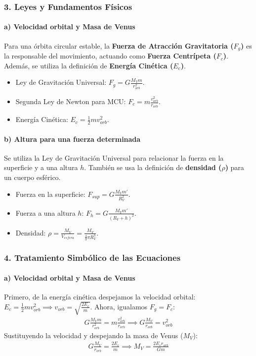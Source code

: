 \subsubsection*{3. Leyes y Fundamentos Físicos}
\paragraph*{a) Velocidad orbital y Masa de Venus}
Para una órbita circular estable, la \textbf{Fuerza de Atracción Gravitatoria ($F_g$)} es la responsable del movimiento, actuando como \textbf{Fuerza Centrípeta ($F_c$)}. Además, se utiliza la definición de \textbf{Energía Cinética ($E_c$)}.
\begin{itemize}
    \item Ley de Gravitación Universal: $F_g = G \frac{M_V m}{r_{orb}^2}$.
    \item Segunda Ley de Newton para MCU: $F_c = m \frac{v_{orb}^2}{r_{orb}}$.
    \item Energía Cinética: $E_c = \frac{1}{2} m v_{orb}^2$.
\end{itemize}
\paragraph*{b) Altura para una fuerza determinada}
Se utiliza la Ley de Gravitación Universal para relacionar la fuerza en la superficie y a una altura $h$. También se usa la definición de \textbf{densidad ($\rho$)} para un cuerpo esférico.
\begin{itemize}
    \item Fuerza en la superficie: $F_{sup} = G \frac{M_V m'}{R_V^2}$.
    \item Fuerza a una altura $h$: $F_h = G \frac{M_V m'}{(R_V+h)^2}$.
    \item Densidad: $\rho = \frac{M_V}{V_{esfera}} = \frac{M_V}{\frac{4}{3}\pi R_V^3}$.
\end{itemize}

\subsubsection*{4. Tratamiento Simbólico de las Ecuaciones}
\paragraph*{a) Velocidad orbital y Masa de Venus}
Primero, de la energía cinética despejamos la velocidad orbital:
$E_c = \frac{1}{2} m v_{orb}^2 \implies v_{orb} = \sqrt{\frac{2 E_c}{m}}$.
Ahora, igualamos $F_g = F_c$:
\begin{gather}
    G \frac{M_V m}{r_{orb}^2} = m \frac{v_{orb}^2}{r_{orb}} \implies G \frac{M_V}{r_{orb}} = v_{orb}^2
\end{gather}
Sustituyendo la velocidad y despejando la masa de Venus ($M_V$):
\begin{gather}
    G \frac{M_V}{r_{orb}} = \frac{2 E_c}{m} \implies M_V = \frac{2 E_c r_{orb}}{G m}
\end{gather}
